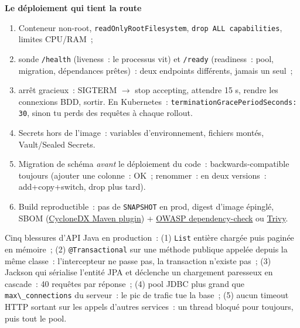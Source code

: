 \documentclass[12pt,a4paper,twoside,openright]{book}
\newcommand{\link}[2]{\href{#2}{#1}}
\newcommand{\etape}[1]{\par\medskip\noindent\textbf{\large #1}\par\smallskip}
\begin{document}
\etape{Le d\'eploiement qui tient la route}
\begin{enumerate}
  \item Conteneur non-root, \verb|readOnlyRootFilesystem|, \verb|drop ALL capabilities|, limites CPU/RAM~;
  \item sonde \verb|/health| (liveness~: le processus vit) et \verb|/ready| (readiness~: pool,
        migration, d\'ependances pr\^etes)~: deux endpoints diff\'erents, jamais un seul~;
  \item arr\^et gracieux~: SIGTERM $\rightarrow$ stop accepting, attendre 15 s, rendre les connexions BDD, sortir.
        En Kubernetes~: \verb|terminationGracePeriodSeconds: 30|, sinon tu perds des requ\^etes \`a chaque rollout.
  \item Secrets hors de l'image~: variables d'environnement, fichiers mont\'es, Vault/Sealed Secrets.
  \item Migration de sch\'ema \emph{avant} le d\'eploiement du code~: backwards-compatible toujours
        (ajouter une colonne~: OK~; renommer~: en deux versions~: add+copy+switch, drop plus tard).
  \item Build reproductible~: pas de \verb|SNAPSHOT| en prod, digest d'image \'epingl\'e, SBOM
        (\link{CycloneDX Maven plugin}{https://github.com/CycloneDX/cyclonedx-maven-plugin})
        + \link{OWASP dependency-check}{https://github.com/jeremylong/DependencyCheck} ou
        \link{Trivy}{https://github.com/aquasecurity/trivy}.
\end{enumerate}

\begin{piege}
Cinq blessures d'API Java en production~: (1) \verb|List| enti\`ere charg\'ee puis pagin\'ee en m\'emoire~;
(2) \verb|@Transactional| sur une m\'ethode publique appel\'ee depuis la m\^eme classe~: l'intercepteur
ne passe pas, la transaction n'existe pas~; (3) Jackson qui s\'erialise l'entit\'e JPA et d\'eclenche un
chargement paresseux en cascade~: 40 requ\^etes par r\'eponse~; (4) pool JDBC plus grand que
\verb|max\_connections| du serveur~: le pic de trafic tue la base~; (5) aucun timeout HTTP sortant
sur les appels d'autres services~: un thread bloqu\'e pour toujours, puis tout le pool.
\end{piege}
\end{document}
